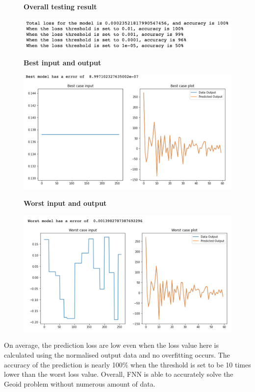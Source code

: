 \begin{figure}[H]
    \textbf{Overall testing result}\par\medskip
    \includegraphics[scale=0.6]{Report LaTeX/figures/geoid_images/Geoid_OverallTesting.png}
\end{figure}

\begin{figure}[H]
    \textbf{Best input and output}\par\medskip
    \includegraphics[scale=0.6]{Report LaTeX/figures/geoid_images/Geoid_Best.png}
\end{figure}

\begin{figure}[H]
    \textbf{Worst input and output}\par\medskip
    \includegraphics[scale=0.6]{Report LaTeX/figures/geoid_images/Geoid_Worst.png}
\end{figure}

On average, the prediction loss are low even when the loss value here is calculated using the normalised output data and no overfitting occurs. The accuracy of the prediction is nearly 100\% when the threshold is set to be 10 times lower than the worst loss value. Overall, FNN is able to accurately solve the Geoid problem without numerous amount of data.


